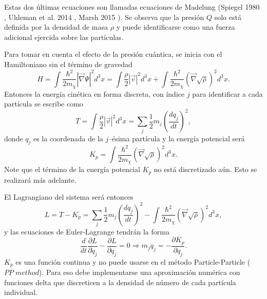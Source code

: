 \documentclass[a4paper,openright,10pt, oneside, final]{book}
\begin{document}
Estas dos últimas ecuaciones son llamadas ecuaciones de Madelung (Spiegel 1980 \cite{3.2}, Uhleman et al. 2014 \cite{3.3}, Marsh 2015 \cite{3.4}). Se observa que la presión $Q$ solo está definida por la densidad de masa $\rho$ y puede identificarse como una fuerza adicional ejercida sobre las partículas.

Para tomar en cuenta el efecto de la presión cuántica, se inicia con el Hamiltoniano sin el término de gravedad
\begin{equation}
H = \int \frac{\hbar^{2}}{2 m_{\chi}} |\vec{\nabla}\Psi|^{2}d^{3}x
  = \int \frac{\rho}{2} |\vec{v}|^{2}d^{3}x + \int \frac{\hbar^{2}}{2 m_{\chi}} (\vec{\nabla}\sqrt{\rho})^{2}d^{3}x.\label{eqn 3.8}
\end{equation}
Entonces la energía cinética en forma discreta, con índice $j$ para identificar a cada partícula se escribe como
\begin{equation}
T = \int \frac{\rho}{2} |\vec{v}|^{2}d^{3}x = \sum_{j} \frac{1}{2} m_{j} \left(\frac{d q_{j}}{dt}\right)^{2}, \label{eqn 3.9}
\end{equation}
donde $q_{j}$ es la coordenada de la $j$--ésima partícula y la energía potencial será 
\begin{equation}
K_{p} = \int \frac{\hbar^{2}}{2 m_{\chi}} (\vec{\nabla}\sqrt{\rho})^{2}d^{3}x. \label{eqn 3.10}
\end{equation}
Note que el término de la energía potencial $K_{p}$ no está discretizado aún. Esto se realizará más adelante.

El Lagrangiano del sistema será entonces 
\begin{equation}
L = T - K_{p}
  =
\sum_{j} \frac{1}{2} m_{j} \left(\frac{d q_{j}}{dt}\right)^{2}
-
 \int \frac{\hbar^{2}}{2 m_{\chi}} (\vec{\nabla}\sqrt{\rho})^{2}d^{3}x,\label{eqn 3.11}  
\end{equation}
y las ecuaciones de Euler-Lagrange tendrán la forma
\begin{equation}
\frac{d}{dt}\frac{\partial L}{\partial \dot{q}_{j}} - \frac{\partial L }{\partial q_{j}} = 0 
\Rightarrow 
m_{j} \ddot{q}_{j} = - \frac{\partial K_{p}}{\partial q_{j}}.\label{eqn 3.12}
\end{equation}
$K_{p}$ es una función continua y no puede usarse en el método Particle-Particle ($PP \; method$). Para eso debe implementarse una aproximación numérica con funciones delta que discreticen a la densidad de número de cada partícula individual.
\end{document}
